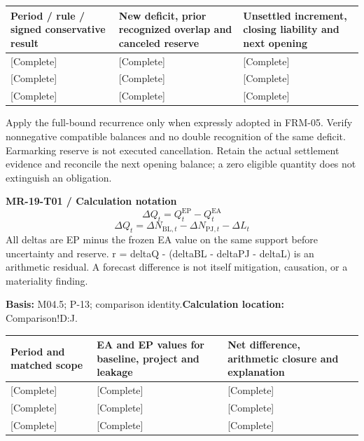 {\sffamily\fontsize{8.6}{10.7}\selectfont\begin{longtable}{@{}P{48mm}P{61mm}P{53mm}@{}}
\toprule
\textbf{Period / rule / signed conservative result} & \textbf{New deficit, prior recognized overlap and canceled reserve} & \textbf{Unsettled increment, closing liability and next opening}\\\midrule\endhead
\rule{0pt}{8mm}[Complete] & [Complete] & [Complete]\\\hline
\rule{0pt}{8mm}[Complete] & [Complete] & [Complete]\\\hline
\rule{0pt}{8mm}[Complete] & [Complete] & [Complete]\\\hline
\end{longtable}}
Apply the full-bound recurrence only when expressly adopted in FRM-05. Verify nonnegative compatible balances and no double recognition of the same deficit. Earmarking reserve is not executed cancellation. Retain the actual settlement evidence and reconcile the next opening balance; a zero eligible quantity does not extinguish an obligation.\par
{}
\par\begingroup\sffamily\fontsize{8.4}{10.5}\selectfont\color{NEBGreen}
\textbf{MR-19-T01 / Calculation notation}\
{\fontsize{10}{12}\selectfont\[\Delta Q_t=Q_t^{\mathrm{EP}}-Q_t^{\mathrm{EA}}\]}
{\fontsize{10}{12}\selectfont\[\Delta Q_t=\Delta N_{\mathrm{BL},t}-\Delta N_{\mathrm{PJ},t}-\Delta L_t\]}
All deltas are EP minus the frozen EA value on the same support before uncertainty and reserve. r = deltaQ - (deltaBL - deltaPJ - deltaL) is an arithmetic residual. A forecast difference is not itself mitigation, causation, or a materiality finding.\par
\textbf{Basis:} M04.5; P-13; comparison identity.\quad\textbf{Calculation location:} Comparison!D:J.\par\endgroup
{\sffamily\fontsize{8.6}{10.7}\selectfont\begin{longtable}{@{}P{48mm}P{61mm}P{53mm}@{}}
\toprule
\textbf{Period and matched scope} & \textbf{EA and EP values for baseline, project and leakage} & \textbf{Net difference, arithmetic closure and explanation}\\\midrule\endhead
\rule{0pt}{8mm}[Complete] & [Complete] & [Complete]\\\hline
\rule{0pt}{8mm}[Complete] & [Complete] & [Complete]\\\hline
\rule{0pt}{8mm}[Complete] & [Complete] & [Complete]\\\hline
\end{longtable}}
